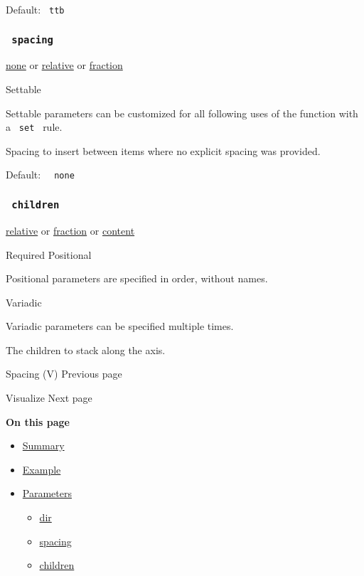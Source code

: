 Default: \texttt{\ ttb\ }

\subsubsection{\texorpdfstring{\texttt{\ spacing\ }}{ spacing }}\label{parameters-spacing}

\href{/docs/reference/foundations/none/}{none} {or}
\href{/docs/reference/layout/relative/}{relative} {or}
\href{/docs/reference/layout/fraction/}{fraction}

{{ Settable }}

\label{parameters-spacing-settable-tooltip}
Settable parameters can be customized for all following uses of the
function with a \texttt{\ set\ } rule.

Spacing to insert between items where no explicit spacing was provided.

Default: \texttt{\ }{\texttt{\ none\ }}\texttt{\ }

\subsubsection{\texorpdfstring{\texttt{\ children\ }}{ children }}\label{parameters-children}

\href{/docs/reference/layout/relative/}{relative} {or}
\href{/docs/reference/layout/fraction/}{fraction} {or}
\href{/docs/reference/foundations/content/}{content}

{Required} {{ Positional }}

\label{parameters-children-positional-tooltip}
Positional parameters are specified in order, without names.

{{ Variadic }}

\label{parameters-children-variadic-tooltip}
Variadic parameters can be specified multiple times.

The children to stack along the axis.

\href{/docs/reference/layout/v/}{\pandocbounded{}}

{ Spacing (V) } { Previous page }

\href{/docs/reference/visualize/}{\pandocbounded{}}

{ Visualize } { Next page }

\textbf{On this page}

\begin{itemize}
\tightlist
\item
  \hyperref[summary]{Summary}
\item
  \hyperref[example]{Example}
\item
  \hyperref[parameters]{Parameters}

  \begin{itemize}
  \tightlist
  \item
    \hyperref[parameters-dir]{dir}
  \item
    \hyperref[parameters-spacing]{spacing}
  \item
    \hyperref[parameters-children]{children}
  \end{itemize}
\end{itemize}

